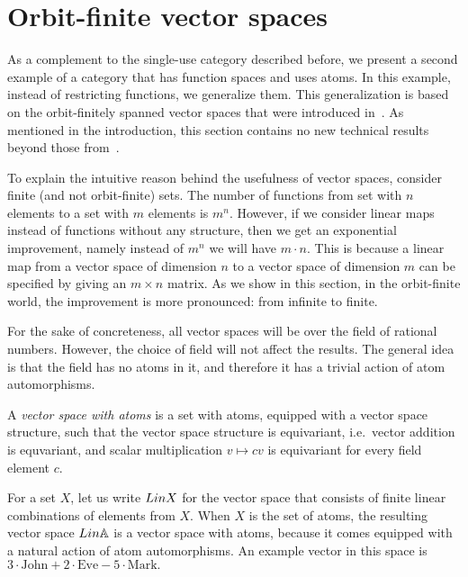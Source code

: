\section{Orbit-finite vector spaces}
As a complement to the single-use category described before, we present a second example of a category that has function spaces and uses atoms. In this example, instead of restricting functions, we generalize them. This generalization is based on the  orbit-finitely spanned vector spaces that were introduced in~\cite{bojanczykKM21OrbitFiniteVector}. As mentioned in the introduction,  this section contains no new technical results beyond those from~\cite{bojanczykKM21OrbitFiniteVector}. 

To explain the intuitive reason behind the usefulness of vector spaces, consider finite (and not orbit-finite) sets. The number of functions from set with $n$ elements to a set with $m$ elements is $m^n$. However, if we consider linear maps instead of functions without any structure, then we get an exponential improvement, namely instead of $m^n$ we will have $m \cdot n$. 
This is because a linear map from a vector space of dimension $n$ to a vector space of dimension $m$ can be specified by giving an $m \times n$ matrix. As we show in this section,  in the orbit-finite world, the improvement is more pronounced: from infinite to finite.

For the sake of concreteness, all  vector spaces will be over the field of rational numbers. However, the choice of field will not affect the results. The general idea is that the field has no atoms in it, and therefore it has a trivial action of atom automorphisms. 
\begin{definition}
    A \emph{vector space with atoms} is a set with atoms, equipped with a vector space structure, such that the vector space structure is equivariant, i.e.~vector addition is equvariant, and  scalar multiplication $v \mapsto cv$ is equivariant for every field element $c$.
\end{definition}


\begin{example} \label{ex:lina} For a set $X$, let us write $\Lin X$ for the vector space that consists of finite linear combinations of elements from $X$. When $X$ is the set of atoms, the resulting vector space $\Lin \atoms$ is a vector space with atoms, because it comes equipped with a natural action of atom automorphisms.  An example vector in this space is $
3 \cdot \text{John} + 2 \cdot \text{Eve} - 5 \cdot \text{Mark}.
$
\end{example}

